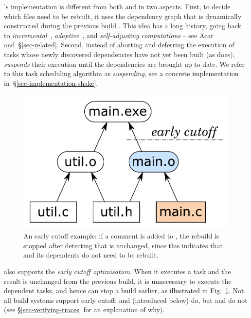 \Shake's implementation is different from both \Make and \Excel in two aspects.
First, to decide which files need to be rebuilt,
it uses the dependency graph that is dynamically constructed during
the previous build . This idea has a long history, going back to
\emph{incremental}~\cite{demers1981incremental},
\emph{adaptive}~\cite{acar2002adaptive}, and
\emph{self-adjusting computations} -- see
Acar~\etal~ and~\S\ref{sec-related}. Second,
instead of aborting and deferring the execution of tasks whose newly discovered
dependencies have not yet been built (as \Excel does), \Shake \emph{suspends}
their execution until the dependencies are brought up to date. We refer to this
task scheduling algorithm as \emph{suspending}, see a concrete implementation
in~\S\ref{sec-implementation-shake}.

\begin{figure}
\centerline{\includegraphics[scale=0.28]{fig/shake-example-cutoff.pdf}}
\caption{An early cutoff example: if a comment is added to , the
rebuild is stopped after detecting that  is unchanged, since this
indicates that  and its dependents do not need to be
rebuilt.\label{fig-cutoff}}
\end{figure}

\Shake also supports the \emph{early cutoff optimisation}. When it
executes a task and the result is unchanged from the previous build, it is
unnecessary to execute the dependent tasks, and hence \Shake can stop a build
earlier, as illustrated in Fig.~\ref{fig-cutoff}. Not all build systems support
early cutoff: \Shake and \Bazel (introduced below) do, but \Make and \Excel do
not (see \S\ref{sec-verifying-traces} for an explanation of why).

